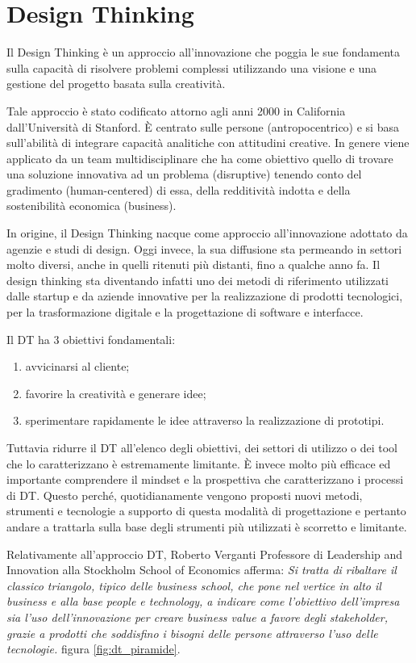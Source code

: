 \section{Design Thinking}
Il Design Thinking è un approccio all’innovazione che poggia le sue fondamenta sulla capacità di risolvere problemi complessi utilizzando una visione e una gestione del progetto basata sulla creatività. 

Tale approccio è stato codificato attorno agli anni 2000 in California dall’Università di Stanford. È centrato sulle persone (antropocentrico) e si basa sull’abilità di integrare capacità analitiche con attitudini creative. In genere viene applicato da un team multidisciplinare che ha come obiettivo quello di trovare una soluzione innovativa ad un problema (disruptive) tenendo conto del gradimento (human-centered) di essa, della redditività indotta e della sostenibilità economica (business).

In origine, il Design Thinking nacque come approccio all’innovazione adottato da agenzie e studi di design. Oggi invece, la sua diffusione sta permeando in settori molto diversi, anche in quelli ritenuti più distanti, fino a qualche anno fa. Il design thinking sta diventando infatti uno dei metodi di riferimento utilizzati dalle startup e da aziende innovative per la realizzazione di prodotti tecnologici, per la trasformazione digitale e la progettazione di software e interfacce.

Il DT ha 3 obiettivi fondamentali:

\begin{enumerate}
    \item avvicinarsi al cliente;
    \item favorire la creatività e generare idee;
    \item sperimentare rapidamente le idee attraverso la realizzazione di prototipi.
\end{enumerate}

Tuttavia ridurre il DT all’elenco degli obiettivi, dei settori di utilizzo o dei tool che lo caratterizzano è estremamente limitante. È invece molto più efficace ed importante comprendere il mindset e la prospettiva che caratterizzano i processi di DT. Questo perché, quotidianamente vengono proposti nuovi metodi, strumenti e tecnologie a supporto di questa modalità di progettazione e pertanto andare a trattarla sulla base degli strumenti più utilizzati è scorretto e limitante.

Relativamente all'approccio DT, Roberto Verganti Professore di Leadership and Innovation alla Stockholm School of Economics afferma: \textit{Si tratta di ribaltare il classico triangolo, tipico delle business school, che pone nel vertice in alto il business e alla base people e technology, a indicare come l’obiettivo dell’impresa sia l’uso dell’innovazione per creare business value a favore degli stakeholder, grazie a prodotti che soddisfino i bisogni delle persone attraverso l’uso delle tecnologie.} figura \ref{fig:dt_piramide}.


